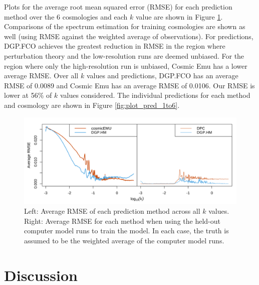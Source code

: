 \documentclass[11pt]{article}
\begin{document}
Plots for the average root mean squared error (RMSE) for each prediction method over the 
6 cosmologies and each $k$ value are shown in Figure \ref{fig:plot_rmse_k}. Comparisons 
of the spectrum estimation for training cosmologies are shown as well (using RMSE against 
the weighted average of observations). For predictions, DGP.FCO achieves the greatest 
reduction in RMSE in the region where perturbation theory and the low-resolution runs 
are deemed unbiased. For the region where only the high-resolution run is unbiased, 
Cosmic Emu has a lower average RMSE. Over all $k$ values and predictions, DGP.FCO has 
an average RMSE of 0.0089 and Cosmic Emu has an average RMSE of 0.0106. Our RMSE is 
lower at 56\% of $k$ values considered. The individual predictions for each method and 
cosmology are shown in Figure \ref{fig:plot_pred_1to6}.

\begin{figure}[ht]
    \centering
    \includegraphics[width=6in]{rmse_by_k.png}
    \caption{Left: Average RMSE of each prediction method across all $k$ values. 
             Right: Average RMSE for each method when using the held-out computer 
             model runs to train the model. In each case, the truth is assumed to 
             be the weighted average of the computer model runs.}
    \label{fig:plot_rmse_k}
\end{figure}


\section{Discussion}
\label{sec:disc}
\end{document}
